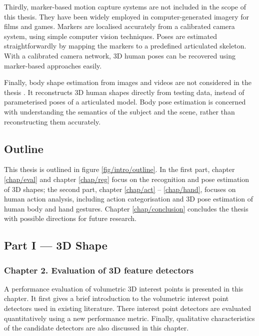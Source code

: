 Thirdly, marker-based motion capture systems are not included in the scope of this thesis. They have been widely employed in computer-generated imagery for films and games. Markers are localised accurately from a calibrated camera system, using simple computer vision techniques. Poses are estimated straightforwardly by mapping the markers to a predefined articulated skeleton.
 With a calibrated camera network, 3D human poses can be recovered using marker-based approaches easily.  

Finally, body shape estimation from images and videos are not considered in the thesis \cite{Guan2009, Rother2009, Chen2011}. It reconstructs 3D human shapes directly from testing data, instead of parameterised poses of a articulated model. Body pose estimation is concerned with understanding the semantics of the subject and the scene, rather than reconstructing them accurately. 

\subsection{Outline}

This thesis is outlined in figure \ref{fig/intro/outline}. In the first part, chapter \ref{chap/eval} and chapter \ref{chap/reg} focus on the recognition and pose estimation of 3D shapes; the second part, chapter \ref{chap/act} -- \ref{chap/hand}, focuses on human action analysis, including action categorisation and 3D pose estimation of human body and hand gestures. Chapter \ref{chap/conclusion} concludes the thesis with possible directions for future research. 

\subsection*{Part I --- 3D Shape}


\subsubsection*{Chapter 2. Evaluation of 3D feature detectors} 
A performance evaluation of volumetric 3D interest points is presented in this chapter. 
It first gives a brief introduction to the volumetric interest point detectors used in existing literature.
There interest point detectors are evaluated quantitatively using a new performance metric.
Finally, qualitative characteristics of the candidate detectors are also discussed in this chapter. 

